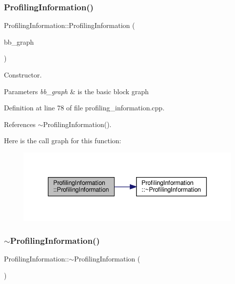 \subsubsection{\texorpdfstring{Profiling\+Information()}{ProfilingInformation()}}
{\footnotesize\ttfamily Profiling\+Information\+::\+Profiling\+Information (\begin{DoxyParamCaption}\item[{const \hyperlink{basic__block_8hpp_ab66bdbde3a29e41d079d8a320af9c921}{B\+B\+Graph\+Const\+Ref}}]{bb\+\_\+graph }\end{DoxyParamCaption})\hspace{0.3cm}{\ttfamily [explicit]}}



Constructor. 


\begin{DoxyParams}{Parameters}
{\em bb\+\_\+graph} & is the basic block graph \\
\hline
\end{DoxyParams}


Definition at line 78 of file profiling\+\_\+information.\+cpp.



References $\sim$\+Profiling\+Information().

Here is the call graph for this function\+:
\nopagebreak
\begin{figure}[H]
\begin{center}
\leavevmode
\includegraphics[width=336pt]{dd/d5b/classProfilingInformation_a4513d68814d5f75c6461a86ced46019c_cgraph}
\end{center}
\end{figure}
\mbox{\label{classProfilingInformation_aa1a69b2ac74f607c5cd739b1d23fcc97}} 
\subsubsection{\texorpdfstring{$\sim$\+Profiling\+Information()}{~ProfilingInformation()}}
{\footnotesize\ttfamily Profiling\+Information\+::$\sim$\+Profiling\+Information (\begin{DoxyParamCaption}{ }\end{DoxyParamCaption})\hspace{0.3cm}{\ttfamily [default]}}




